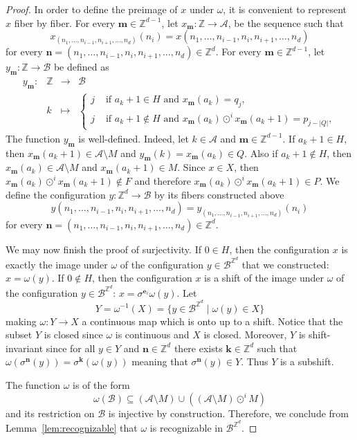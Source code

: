 \documentclass[12pt]{amsart}
\newcommand{\Z}{\mathbb{Z}}
\newcommand{\be}{{\boldsymbol{e}}}
\newcommand{\bk}{{\boldsymbol{k}}}
\newcommand{\bn}{{\boldsymbol{n}}}
\newcommand{\Bm}{{\boldsymbol{m}}} %
\newcommand{\Acal}{\mathcal{A}} %
\newcommand{\Bcal}{\mathcal{B}}
\begin{document}
\begin{proof}
    In order to define the preimage of $x$ under $\omega$, it is convenient to
    represent $x$ fiber by fiber. For every $\Bm\in\Z^{d-1}$, let
    $x_\Bm:\Z\to\Acal$, be the sequence such that 
    \[
        x_{(n_1,\dots,n_{i-1},n_{i+1},\dots,n_d)}(n_i)
        =
        x(n_1,\dots,n_{i-1},n_i,n_{i+1},\dots,n_d)
    \]
    for every $\bn=(n_1,\dots,n_{i-1},n_i,n_{i+1},\dots,n_d)\in\Z^d$.
    For every $\Bm\in\Z^{d-1}$, let $y_\Bm:\Z\to\Bcal$ be defined as
    \begin{equation*}
    \begin{array}{rccl}
        y_\Bm:&\Z & \to & \Bcal\\
        &k & \mapsto &
    \begin{cases}
        j & \text{ if }a_k+1\in H \text{ and } x_\Bm(a_k)=q_j,\\
        j & \text{ if }a_k+1\notin H    \text{ and } x_\Bm(a_k)\odot^i x_\Bm(a_k+1)=p_{j-|Q|}, 
    \end{cases}
    \end{array}
    \end{equation*}
    The function $y_\Bm$ is well-defined.
    Indeed, let $k\in\Acal$ and $\Bm\in\Z^{d-1}$.
    If $a_k+1\in H$, then 
    $x_\Bm(a_k+1)\in\Acal\setminus M$
    and
    $y_\Bm(k)= x_\Bm(a_k)\in Q$.
    Also if $a_k+1\notin H$, then 
    $x_\Bm(a_k)\in\Acal\setminus M$
    and 
    $x_\Bm(a_k+1)\in M$.
    Since $x\in X$, then $x_\Bm(a_k)\odot^i x_\Bm(a_k+1)\notin F$
    and therefore $x_\Bm(a_k)\odot^i x_\Bm(a_k+1)\in P$.
    We define the configuration $y:\Z^d\to\Bcal$ by its fibers constructed above
    \[
        y(n_1,\dots,n_{i-1},n_i,n_{i+1},\dots,n_d)
        =
        y_{(n_1,\dots,n_{i-1},n_{i+1},\dots,n_d)}(n_i)
    \]
    for every $\bn=(n_1,\dots,n_{i-1},n_i,n_{i+1},\dots,n_d)\in\Z^d$.

    We may now finish the proof of surjectivity.
If $0\in H$, 
then the configuration $x$ is exactly the image under $\omega$ of the configuration $y\in\Bcal^{\Z^d}$ that
we constructed: $x=\omega(y)$.
If $0\notin H$, then 
the configuration $x$ is a shift of the image under $\omega$ of the
configuration $y\in\Bcal^{\Z^d}$: $x=\sigma^{\be_i}\omega(y)$.
    Let
    \[
        Y = \omega^{-1}(X) = \{y\in\Bcal^{\Z^d} \mid \omega(y)\in X\}
    \]
    making $\omega:Y\to X$ a continuous map which is onto up to a shift.
    Notice that the subset $Y$ is closed since $\omega$ is continuous and $X$ is closed.
    Moreover, $Y$ is shift-invariant since 
    for all $y\in Y$ and $\bn\in\Z^d$
    there exists $\bk\in\Z^d$ such that $\omega(\sigma^\bn(y))=\sigma^\bk(\omega(y))$
    meaning that $\sigma^\bn(y)\in Y$.
    Thus $Y$ is a subshift.

The function $\omega$ is of the form
\begin{equation*}
    \omega(\Bcal)
    \subseteq (\Acal\setminus M)
    \cup \left((\Acal\setminus M)\odot^i M\right)
\end{equation*}
and its restriction on $\Bcal$ is injective by construction.
    Therefore, we conclude from Lemma~\ref{lem:recognizable} that
    $\omega$ is recognizable in $\Bcal^{\Z^d}$.
\end{proof}
\end{document}
